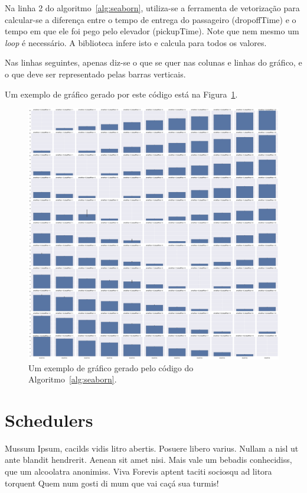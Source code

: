 Na linha 2 do algoritmo~\ref{alg:seaborn}, utiliza-se a ferramenta de
vetorização para calcular-se a diferença entre o tempo de entrega do passageiro
(\textsf{dropoffTime}) e o tempo em que ele foi pego pelo elevador
(\textsf{pickupTime}). Note que nem mesmo um \textit{loop} é necessário. A
biblioteca infere isto e calcula para todos os valores.

Nas linhas seguintes, apenas diz-se o que se quer nas colunas e linhas do
gráfico, e o que deve ser representado pelas barras verticais.

Um exemplo de gráfico gerado por este código está na Figura~\ref{fig:seaborn:exemplo}.

\begin{figure}[htb]
  \centering
  \includegraphics[scale=0.1]{img/seaborn_example.eps}
  \caption{Um exemplo de gráfico gerado pelo código do
    Algoritmo~\ref{alg:seaborn}.}
  \label{fig:seaborn:exemplo}
\end{figure}

\section{Schedulers}

Mussum Ipsum, cacilds vidis litro abertis. Posuere libero varius. Nullam a nisl
ut ante blandit hendrerit. Aenean sit amet nisi. Mais vale um bebadis
conhecidiss, que um alcoolatra anonimiss. Viva Forevis aptent taciti sociosqu ad
litora torquent Quem num gosti di mum que vai caçá sua turmis!

